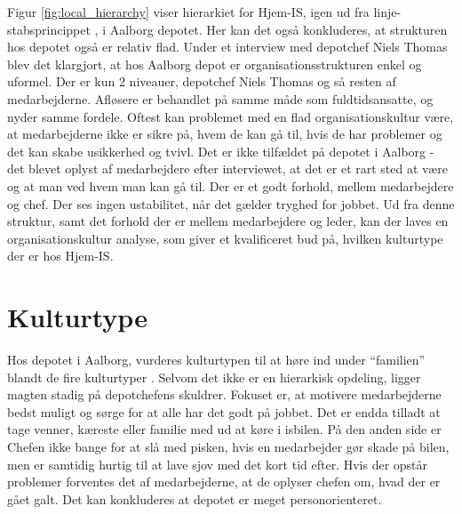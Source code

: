 Figur \ref{fig:local_hierarchy} viser hierarkiet for Hjem-IS, igen ud fra linje-stabsprincippet \cite{Organisation}, i Aalborg depotet. Her kan det også konkluderes, at strukturen hos depotet også er relativ flad. Under et interview med depotchef Niels Thomas blev det klargjort, at hos Aalborg depot er organisationsstrukturen enkel og uformel. Der er kun 2 niveauer, depotchef Niels Thomas og så resten af medarbejderne. Afløsere er behandlet på samme måde som fuldtidsansatte, og nyder samme fordele. Oftest kan problemet med en flad organisationskultur være, at medarbejderne ikke er sikre på, hvem de kan gå til, hvis de har problemer og det kan skabe usikkerhed og tvivl. Det er ikke tilfældet på depotet i Aalborg - det blevet oplyst af medarbejdere efter interviewet, at det er et rart sted at være og at man ved hvem man kan gå til. Der er et godt forhold, mellem medarbejdere og chef. Der ses ingen ustabilitet, når det gælder tryghed for jobbet. Ud fra denne struktur, samt det forhold der er mellem medarbejdere og leder, kan der laves en organisationskultur analyse, som giver et kvalificeret bud på, hvilken kulturtype der er hos Hjem-IS.

\section{Kulturtype}
Hos depotet i Aalborg, vurderes kulturtypen til at høre ind under “familien” blandt de fire kulturtyper \cite{Organisation}. Selvom det ikke er en hierarkisk opdeling, ligger magten stadig på depotchefens skuldrer. Fokuset er, at motivere medarbejderne bedst muligt og sørge for at alle har det godt på jobbet. Det er endda tilladt at tage venner, kæreste eller familie med ud at køre i isbilen. På den anden side er Chefen ikke bange for at slå med pisken, hvis en medarbejder gør skade på bilen, men er samtidig hurtig til at lave sjov med det kort tid efter. Hvis der opstår problemer forventes det af medarbejderne, at de oplyser chefen om, hvad der er gået galt. 
Det kan konkluderes at depotet er meget personorienteret.

